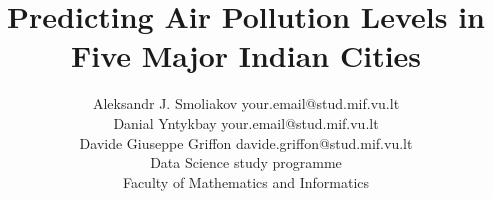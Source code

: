 \documentclass[twoside,11pt]{article}
\begin{document}
\title{Predicting Air Pollution Levels in Five Major Indian Cities}

\author{\name Aleksandr J. Smoliakov \email your.email@stud.mif.vu.lt \\
  \name Danial Yntykbay \email your.email@stud.mif.vu.lt \\
  \name Davide Giuseppe Griffon \email davide.griffon@stud.mif.vu.lt \\
  \addr Data Science study programme\\
       Faculty of Mathematics and Informatics}


\maketitle
\end{document}
